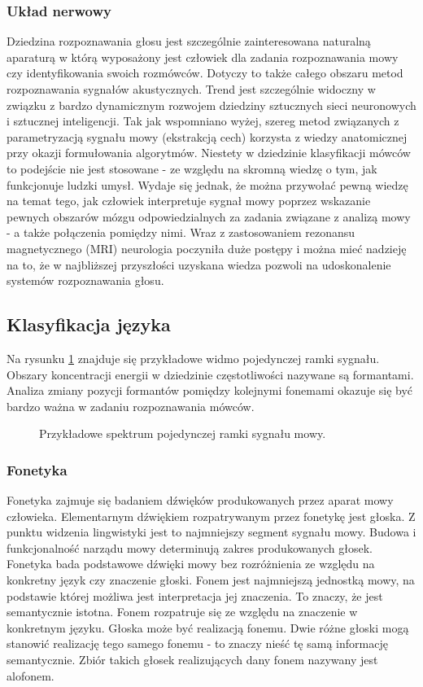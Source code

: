 \subsubsection{Układ nerwowy}

Dziedzina rozpoznawania głosu jest szczególnie zainteresowana naturalną aparaturą w którą wyposażony jest człowiek dla zadania rozpoznawania mowy czy identyfikowania swoich rozmówców. Dotyczy to także całego obszaru metod rozpoznawania sygnałów akustycznych. Trend jest szczególnie widoczny w związku z bardzo dynamicznym rozwojem dziedziny sztucznych sieci neuronowych i sztucznej inteligencji. Tak jak wspomniano wyżej, szereg metod związanych z parametryzacją sygnału mowy
(ekstrakcją cech) korzysta z wiedzy anatomicznej przy okazji formułowania algorytmów. Niestety w dziedzinie klasyfikacji mówców to podejście nie jest stosowane - ze względu na skromną wiedzę o tym, jak funkcjonuje ludzki umysł. Wydaje się jednak, że można przywołać pewną wiedzę na temat tego, jak człowiek interpretuje sygnał mowy poprzez wskazanie pewnych obszarów mózgu odpowiedzialnych za zadania związane z analizą mowy - a także połączenia pomiędzy nimi. Wraz z zastosowaniem rezonansu magnetycznego (MRI) neurologia poczyniła duże postępy i można mieć nadzieję na to, że w najbliższej przyszłości uzyskana wiedza pozwoli na udoskonalenie systemów rozpoznawania głosu.

\subsection{Klasyfikacja języka}
\label{formant}
Na rysunku \ref{fig:spectrum} znajduje się przykładowe widmo pojedynczej ramki sygnału. Obszary koncentracji energii w dziedzinie częstotliwości nazywane są formantami. Analiza zmiany pozycji formantów pomiędzy kolejnymi fonemami okazuje się być bardzo ważna w zadaniu rozpoznawania mówców. 

\begin{figure}[ht!]
  \centering
    
    \caption{\label{fig:spectrum} Przykładowe spektrum pojedynczej ramki sygnału mowy.}
\end{figure}

\subsubsection{Fonetyka}
Fonetyka zajmuje się badaniem dźwięków produkowanych przez aparat mowy człowieka. Elementarnym dźwiękiem rozpatrywanym przez fonetykę jest głoska. Z punktu widzenia lingwistyki jest to najmniejszy segment sygnału mowy. Budowa i funkcjonalność narządu mowy determinują zakres produkowanych głosek. Fonetyka bada podstawowe dźwięki mowy bez rozróżnienia ze względu na konkretny język czy znaczenie głoski.
Fonem jest najmniejszą jednostką mowy, na podstawie której możliwa jest interpretacja jej znaczenia. To znaczy, że jest semantycznie istotna. Fonem rozpatruje się ze względu na znaczenie w konkretnym języku. Głoska może być realizacją fonemu. Dwie różne głoski mogą stanowić realizację tego samego fonemu - to znaczy nieść tę samą informację semantycznie. Zbiór takich głosek realizujących dany fonem nazywany jest alofonem.

